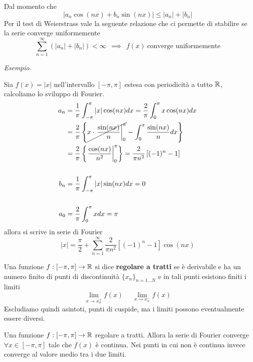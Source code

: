\begin{rem}
Dal momento che
\begin{equation*}
| a_{n}\cos(nx) + b_{n}\sin(nx)| \leq | a_{n}| + | b_{n}|
\end{equation*}
Per il test di Weierstrass vale la seguente relazione che ci permette di stabilire se la serie converge uniformemente
\begin{equation*}
\sum\limits^{\infty}_{n = 1}(| a_{n}| + | b_{n}|) < \infty \ \ \implies \ \ f(x) \ \text{converge uniformemente}
\end{equation*}
\end{rem}
\textit{Esempio.}

Sia $f(x) =| x| $ nell'intervallo $[- \pi, \pi]$ estesa con periodicità a tutto $\mathbb{R}$, calcoliamo lo sviluppo di Fourier.
\begin{align*}
a_{n} & = \frac{1}{\pi}\int^{\pi}_{- \pi}| x| \cos(nx) dx = \frac{2}{\pi}\int^{\pi}_{0} x\cos(nx) dx\\
 & = \frac{2}{\pi}\left\{\cancel{x\cdot \left. \frac{\sin(nx)}{n}\right|^{\pi}_{0}} - \int^{\pi}_{0}\frac{\sin(nx)}{n} dx\right\}\\
 & = \frac{2}{\pi}\left\{\left. \frac{\cos(nx)}{n^{2}}\right|^{\pi}_{0}\right\} = \frac{2}{\pi n^{2}}\left[(- 1)^{n} - 1\right]\\
 & \\
b_{n} & = \frac{1}{\pi}\int^{\pi}_{- \pi}| x| \sin(nx) dx = 0\\
 & \\
a_{0} & = \frac{2}{\pi}\int^{\pi}_{0} xdx = \pi
\end{align*}
allora si scrive in serie di Fourier
\begin{equation*}
| x| = \frac{\pi}{2} + \sum\limits^{\infty}_{n = 1}\frac{2}{\pi n^{2}}\left[(- 1)^{n} - 1\right]\cos(nx)
\end{equation*}
\begin{defn}
Una funzione $f: [- \pi, \pi]\rightarrow \mathbb{R}$ si dice \textbf{regolare a tratti} se è derivabile e ha un numero finito di punti di discontinuità $\{x_{n}\}_{n = 1\dotsc N}$ e in tali punti esistono finiti i limiti
\begin{equation*}
\lim\limits_{x\rightarrow x^{+}_{n}} f(x) \ \ \ \ \ \ \lim\limits_{x\rightarrow x^{-}_{n}} f(x)
\end{equation*}
Escludiamo quindi asintoti, punti di cuspide, ma i limiti possono eventualmente essere diversi.
\end{defn}
\begin{thm}
Una funzione $f: [- \pi, \pi]\rightarrow \mathbb{R}$ regolare a tratti. Allora la serie di Fourier converge $\forall x\in [- \pi, \pi]$ tale che $f(x)$ è continua. Nei punti in cui non è continua invece converge al valore medio tra i due limiti.
\end{thm}
